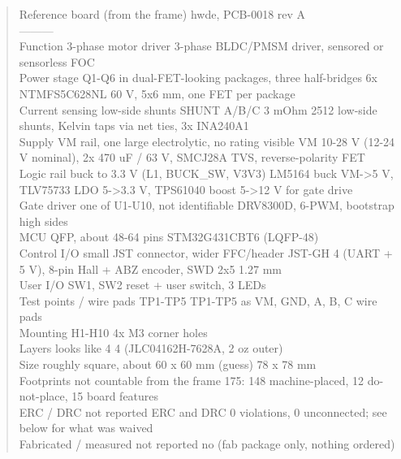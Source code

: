 \documentclass[11pt,a4paper]{article}
\begin{document}
\begin{quote}\small\ttfamily\raggedright
\textbar{} \textbar{} Reference board (from the frame) \textbar{} hwde, PCB-0018 rev A \textbar{}\\
\textbar{}---\textbar{}---\textbar{}---\textbar{}\\
\textbar{} Function \textbar{} 3-phase motor driver \textbar{} 3-phase BLDC/PMSM driver, sensored or sensorless FOC \textbar{}\\
\textbar{} Power stage \textbar{} Q1-Q6 in dual-FET-looking packages, three half-bridges \textbar{} 6x NTMFS5C628NL 60 V, 5x6 mm, one FET per package \textbar{}\\
\textbar{} Current sensing \textbar{} low-side shunts SHUNT A/B/C \textbar{} 3 mOhm 2512 low-side shunts, Kelvin taps via net ties, 3x INA240A1 \textbar{}\\
\textbar{} Supply \textbar{} VM rail, one large electrolytic, no rating visible \textbar{} VM 10-28 V (12-24 V nominal), 2x 470 uF / 63 V, SMCJ28A TVS, reverse-polarity FET \textbar{}\\
\textbar{} Logic rail \textbar{} buck to 3.3 V (L1, BUCK\_SW, V3V3) \textbar{} LM5164 buck VM-\textgreater{}5 V, TLV75733 LDO 5-\textgreater{}3.3 V, TPS61040 boost 5-\textgreater{}12 V for gate drive \textbar{}\\
\textbar{} Gate driver \textbar{} one of U1-U10, not identifiable \textbar{} DRV8300D, 6-PWM, bootstrap high sides \textbar{}\\
\textbar{} MCU \textbar{} QFP, about 48-64 pins \textbar{} STM32G431CBT6 (LQFP-48) \textbar{}\\
\textbar{} Control I/O \textbar{} small JST connector, wider FFC/header \textbar{} JST-GH 4 (UART + 5 V), 8-pin Hall + ABZ encoder, SWD 2x5 1.27 mm \textbar{}\\
\textbar{} User I/O \textbar{} SW1, SW2 \textbar{} reset + user switch, 3 LEDs \textbar{}\\
\textbar{} Test points / wire pads \textbar{} TP1-TP5 \textbar{} TP1-TP5 as VM, GND, A, B, C wire pads \textbar{}\\
\textbar{} Mounting \textbar{} H1-H10 \textbar{} 4x M3 corner holes \textbar{}\\
\textbar{} Layers \textbar{} looks like 4 \textbar{} 4 (JLC04162H-7628A, 2 oz outer) \textbar{}\\
\textbar{} Size \textbar{} roughly square, about 60 x 60 mm (guess) \textbar{} 78 x 78 mm \textbar{}\\
\textbar{} Footprints \textbar{} not countable from the frame \textbar{} 175: 148 machine-placed, 12 do-not-place, 15 board features \textbar{}\\
\textbar{} ERC / DRC \textbar{} not reported \textbar{} ERC and DRC 0 violations, 0 unconnected; see below for what was waived \textbar{}\\
\textbar{} Fabricated / measured \textbar{} not reported \textbar{} no (fab package only, nothing ordered) \textbar{}
\end{quote}
\end{document}

